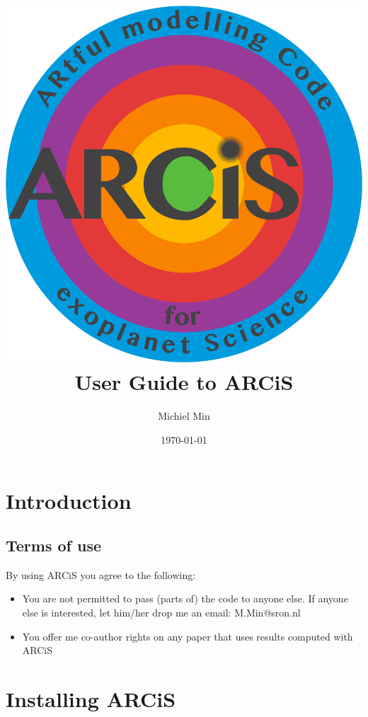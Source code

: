 \documentclass[12pt]{article}
\begin{document}
\title{\includegraphics[width=0.9\hsize]{ARCiS}\\User Guide to ARCiS}
\author{Michiel Min}
\date{\today}
\maketitle

\section{Introduction}


\subsection{Terms of use}

By using ARCiS you agree to the following:
\begin{itemize}
\item You are not permitted to pass (parts of) the code to anyone else. If anyone else is interested, let him/her drop me an email: M.Min@sron.nl
\item You offer me co-author rights on any paper that uses results computed with ARCiS
\end{itemize}

\section{Installing ARCiS}
\end{document}
